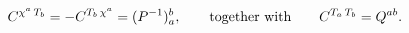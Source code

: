 \begin{equation*}
C^{\chi^a\,T_b}=-C^{T_b\,\chi^a}=(P^{-1})^{b}_{ a},
\qquad\text{together with}\qquad
C^{T_a\, T_b}=Q\sp{ab}.
\label{2}
\end{equation*}

